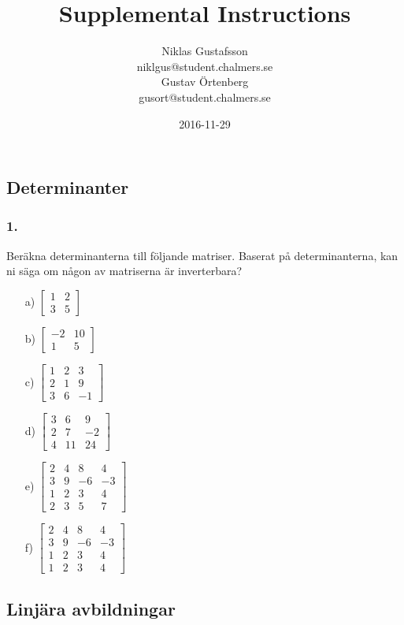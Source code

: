 \documentclass{article}
\title{Supplemental Instructions}
\author{Niklas Gustafsson \\ 
		\small{niklgus@student.chalmers.se} \\
		Gustav Örtenberg \\ 
		\small{gusort@student.chalmers.se}
}
\date{
      2016-11-29
     }
\begin{document}
\maketitle

\subsection*{Determinanter}
\subsubsection*{1.}
Beräkna determinanterna till följande matriser. Baserat på determinanterna, kan ni säga om någon av matriserna är inverterbara?
\begin{itemize}
	\item[a) ] $\begin{bmatrix}1 & 2 \\ 3 & 5\end{bmatrix}$
	\item[b) ] $\begin{bmatrix}-2 & 10 \\ 1 & 5\end{bmatrix}$
	\item[c) ] $\begin{bmatrix}1 & 2 & 3\\ 2 & 1 & 9 \\ 3 & 6 & -1\end{bmatrix}$
	\item[d) ] $\begin{bmatrix}3 & 6 & 9\\ 2 & 7 & -2 \\ 4 & 11 & 24\end{bmatrix}$
	\item[e) ] $\begin{bmatrix} 2 & 4 & 8 & 4\\ 3 & 9 & -6 & -3 \\ 1 & 2 & 3 & 4 \\ 2 & 3 & 5 & 7 \end{bmatrix}$
	\item[f) ] $\begin{bmatrix} 2 & 4 & 8 & 4\\ 3 & 9 & -6 & -3 \\ 1 & 2 & 3 & 4 \\ 1 & 2 & 3 & 4 \end{bmatrix}$
\end{itemize}

\subsection*{Linjära avbildningar}
\end{document}

